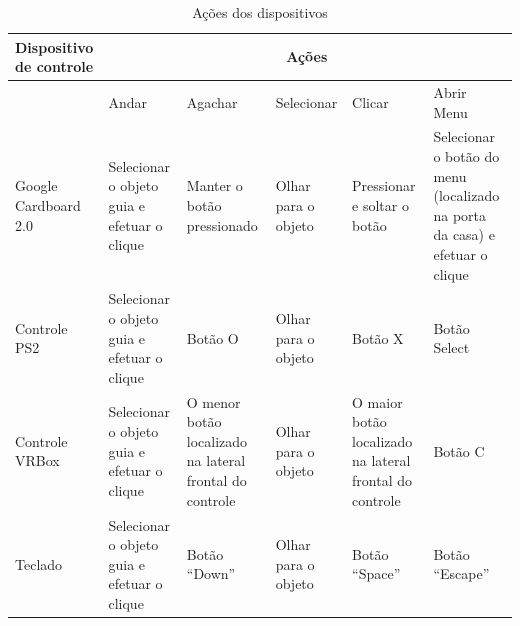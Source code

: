 \begin{table}[H]	
	\caption{Ações dos dispositivos} 
	\label{t.acoes} 
	\centering
	\begin{tabular}{p{2.2cm}|p{2.2cm}|p{2.2cm}|p{2.2cm}|p{2.2cm}|p{2.2cm}}		
		\textbf{\small Dispositivo de controle} & \multicolumn{5}{c}{\textbf{\small Ações}}  \\ \hline \hline
		{} & {\small Andar} & {\small Agachar}  & {\small Selecionar} & {\small Clicar}  & {\small Abrir Menu}\\\hline \hline
		{\small Google Cardboard 2.0} & {\small Selecionar o objeto guia e efetuar o clique} & {\small Manter o botão pressionado} &{\small Olhar para o objeto} & {\small Pressionar e soltar o botão} & {\small Selecionar o botão do menu (localizado na porta da casa) e efetuar o clique}\\\hline		 
		{\small Controle PS2} & {\small Selecionar o objeto guia e efetuar o clique} & {\small Botão O} &{\small Olhar para o objeto} & {\small Botão X} & {\small Botão Select}\\\hline		 
		{\small Controle VRBox} & {\small Selecionar o objeto guia e efetuar o clique} & {\small O menor botão localizado na lateral frontal do controle} &{\small Olhar para o objeto} & {\small O maior botão localizado na lateral frontal do controle} & {\small Botão C}\\\hline  		 
		{\small Teclado} & {\small Selecionar o objeto guia e efetuar o clique} & {\small Botão “Down”} &{\small Olhar para o objeto} & {\small Botão “Space”} & {\small Botão “Escape”} 	\\\hline		
	\end{tabular}
\end{table}
